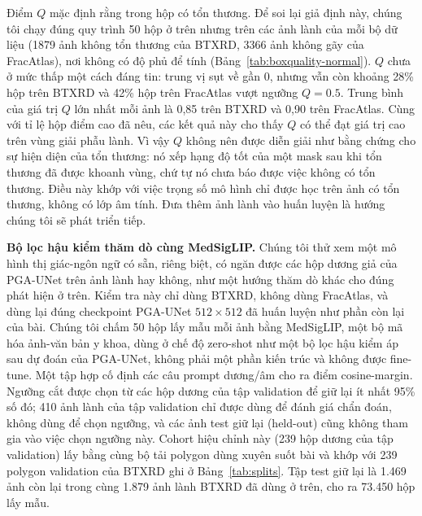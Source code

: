 \documentclass[11pt]{article}
\begin{document}
Điểm $Q$ mặc định rằng trong hộp có tổn thương. Để soi lại giả định này, chúng tôi chạy đúng quy trình 50 hộp ở trên nhưng trên các ảnh lành của mỗi bộ dữ liệu (1879 ảnh không tổn thương của BTXRD, 3366 ảnh không gãy của FracAtlas), nơi không có độ phủ để tính (Bảng~\ref{tab:boxquality-normal}). $Q$ chưa ở mức thấp một cách đáng tin: trung vị sụt về gần 0, nhưng vẫn còn khoảng 28\% hộp trên BTXRD và 42\% hộp trên FracAtlas vượt ngưỡng $Q = 0.5$. Trung bình của giá trị $Q$ lớn nhất mỗi ảnh là 0,85 trên BTXRD và 0,90 trên FracAtlas. Cùng với tỉ lệ hộp điểm cao đã nêu, các kết quả này cho thấy $Q$ có thể đạt giá trị cao trên vùng giải phẫu lành. Vì vậy $Q$ không nên được diễn giải như bằng chứng cho sự hiện diện của tổn thương: nó xếp hạng độ tốt của một mask sau khi tổn thương đã được khoanh vùng, chứ tự nó chưa báo được việc không có tổn thương. Điều này khớp với việc trọng số mô hình chỉ được học trên ảnh có tổn thương, không có lớp âm tính. Đưa thêm ảnh lành vào huấn luyện là hướng chúng tôi sẽ phát triển tiếp.

\begin{table}[H]
\caption{Phân bố điểm tự đánh giá $Q$ trên các ảnh lành (không tổn thương), mỗi ảnh lấy 50 hộp ngẫu nhiên. Không có tổn thương nên không định nghĩa độ phủ; chỉ báo cáo phân bố của $Q$.}
\label{tab:boxquality-normal}
\centering
\scriptsize
{}
\end{table}

\textbf{Bộ lọc hậu kiểm thăm dò cùng MedSigLIP.} Chúng tôi thử xem một mô hình thị giác-ngôn ngữ có sẵn, riêng biệt, có ngăn được các hộp dương giả của PGA-UNet trên ảnh lành hay không, như một hướng thăm dò khác cho đúng phát hiện ở trên. Kiểm tra này chỉ dùng BTXRD, không dùng FracAtlas, và dùng lại đúng checkpoint PGA-UNet $512\times512$ đã huấn luyện như phần còn lại của bài. Chúng tôi chấm 50 hộp lấy mẫu mỗi ảnh bằng MedSigLIP, một bộ mã hóa ảnh-văn bản y khoa, dùng ở chế độ zero-shot như một bộ lọc hậu kiểm áp sau dự đoán của PGA-UNet, không phải một phần kiến trúc và không được fine-tune. Một tập hợp cố định các câu prompt dương/âm cho ra điểm cosine-margin. Ngưỡng cắt được chọn từ các hộp dương của tập validation để giữ lại ít nhất 95\% số đó; 410 ảnh lành của tập validation chỉ được dùng để đánh giá chẩn đoán, không dùng để chọn ngưỡng, và các ảnh test giữ lại (held-out) cũng không tham gia vào việc chọn ngưỡng này. Cohort hiệu chỉnh này (239 hộp dương của tập validation) lấy bằng cùng bộ tải polygon dùng xuyên suốt bài và khớp với 239 polygon validation của BTXRD ghi ở Bảng~\ref{tab:splits}. Tập test giữ lại là 1.469 ảnh còn lại trong cùng 1.879 ảnh lành BTXRD đã dùng ở trên, cho ra 73.450 hộp lấy mẫu.
\end{document}
